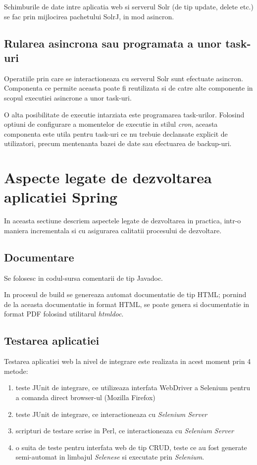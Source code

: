 Schimburile de date intre aplicatia web si serverul Solr (de tip update, delete
etc.) se fac prin mijlocirea pachetului SolrJ, in mod asincron.

\subsection{Rularea asincrona sau programata a unor task-uri}
Operatiile prin care se interactioneaza cu serverul Solr sunt efectuate
asincron.
Componenta ce permite aceasta poate fi reutilizata si de catre alte
componente in scopul executiei asincrone a unor task-uri.

O alta posibilitate de executie intarziata este programarea task-urilor.
Folosind optiuni de configurare a momentelor de executie in stilul \emph{cron},
aceasta componenta este utila pentru task-uri ce nu trebuie declansate explicit de
utilizatori, precum mentenanta bazei de date sau efectuarea de backup-uri.

\section{Aspecte legate de dezvoltarea aplicatiei Spring}
In aceasta sectiune descriem aspectele legate de dezvoltarea in practica, intr-o
maniera incrementala si cu asigurarea calitatii procesului de dezvoltare.

\subsection{Documentare}
Se folosesc in codul-sursa comentarii de tip Javadoc. 

In procesul de build se genereaza automat documentatie de tip HTML;
pornind de la aceasta documentatie in format HTML, se poate genera si documentatie in format PDF 
folosind utilitarul \emph{htmldoc}.

\subsection{Testarea aplicatiei}
Testarea aplicatiei web la nivel de integrare este realizata in acest moment prin 4 metode:
\begin{enumerate}
\item
teste JUnit de integrare, ce utilizeaza interfata WebDriver a Selenium pentru a comanda direct browser-ul (Mozilla Firefox)
\item
teste JUnit de integrare, ce interactioneaza cu \emph{Selenium Server}
\item
scripturi de testare scrise in Perl, ce interactioneaza cu \emph{Selenium Server}
\item
o suita de teste pentru interfata web de tip CRUD, 
teste ce au fost generate semi-automat in limbajul \emph{Selenese} 
si executate prin \emph{Selenium}.
\end{enumerate}

